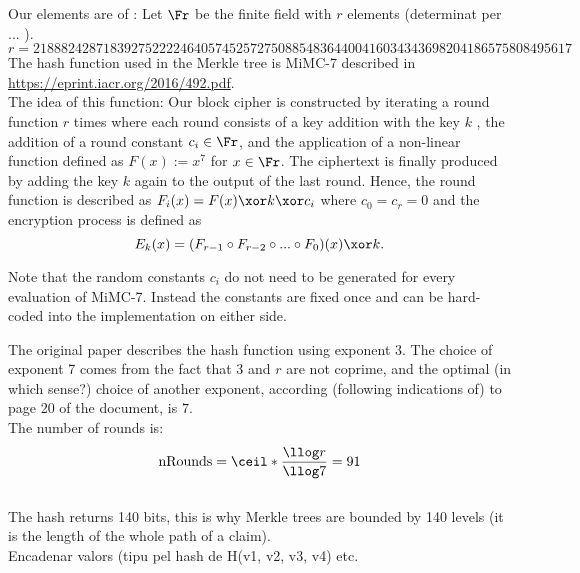 Our elements are of : 
	Let $\Fr$ be the finite field with $r$ elements (determinat per ... ). 
	$$ r = 	21888242871839275222246405745257275088548364400416034343698204186575808495617 $$
The hash function used in the Merkle tree is MiMC-7 described in \url{https://eprint.iacr.org/2016/492.pdf}.\\

The idea of this function: Our block cipher is constructed by iterating a round function
$r$
times where each round consists of a key addition with the key
$k$
, the addition of
a round constant
$c_i\in \Fr$, and the application of a non-linear function defined as
$F(x) :=x^7$ for $x\in \Fr$. The ciphertext is finally produced by adding the key
$k$ again to the output of the last round. Hence, the round function is described as
$F_i(x) = F(x) \xor k \xor c_i$ where $c_0 = c_r = 0$ and the encryption process is defined as 
	$$ E_k(x) = (F_{r-1} \circ F_{r-2} \circ ... \circ F_0)(x) \xor k. $$

Note  that  the  random  constants $c_i$ do  not  need  to  be  generated  for  every
evaluation of MiMC-7. Instead the constants are fixed once and can be hard-coded
into the implementation on either side. 



The original paper describes the hash function using exponent 3. The choice of exponent 7 comes from the fact that 3 and $r$ are not coprime, and the optimal {\color{blue}(in which sense?)} choice of another exponent, according (following indications of) to page 20 of the document, is $7$.\\

The number of rounds is: 
	$$ \text{nRounds} = \ceil*{\frac{\llog r}{\llog 7}} = 91 $$\\

The hash returns 140 bits, this is why Merkle trees are bounded by 140 levels (it is the length of the whole path of a claim). \\

Encadenar valors (tipu pel hash de H(v1, v2, v3, v4) etc.\\

